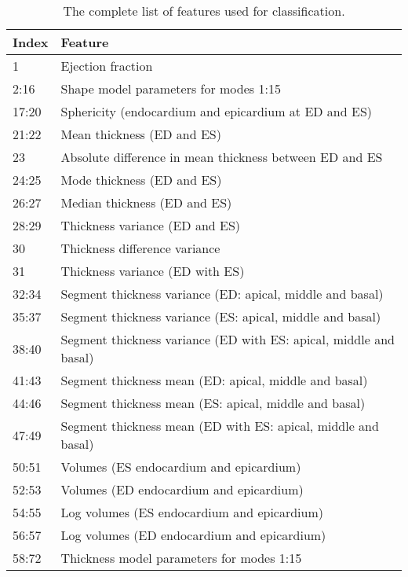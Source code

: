 \documentclass[journal]{IEEEtran}
\begin{document}
\begin{table}

		\begin{center}
	
		\begin{tabular}{l|l|}
\textbf{Index} \space & \multicolumn{1}{l}{\textbf{Feature}}
\\
 \hline
\cline{1-2}
 1 & Ejection fraction \\
\cline{1-2}
 2:16 & Shape model parameters for modes 1:15\\
\cline{1-2}
 17:20 & Sphericity (endocardium and epicardium at ED and ES)\\
 \cline{1-2}
 21:22 & Mean thickness (ED and ES)\\
  23 & Absolute difference in mean thickness between ED and ES\\
 
  24:25 & Mode thickness (ED and ES)\\
  
  26:27 & Median thickness (ED and ES)\\
  
  28:29 & Thickness variance (ED and ES)\\
  
  30 & Thickness difference variance\\
  
  31 & Thickness variance (ED with ES)\\
   \cline{1-2}
  32:34 & Segment thickness variance (ED: apical, middle and basal)\\
   35:37 & Segment thickness variance (ES: apical, middle and basal)\\
  
  38:40 & Segment thickness variance (ED with ES: apical, middle and basal)\\
  \cline{1-2}
  41:43 & Segment thickness mean (ED: apical, middle and basal)\\
  44:46 & Segment thickness mean (ES: apical, middle and basal)\\
   47:49 & Segment thickness mean (ED with ES: apical, middle and basal)\\
   \cline{1-2}
   50:51 & Volumes (ES endocardium and epicardium) \\
   52:53 & Volumes (ED endocardium and epicardium) \\
   \cline{1-2}
    54:55 & Log volumes (ES endocardium and epicardium) \\
   56:57 & Log volumes (ED endocardium and epicardium) \\
    \cline{1-2}
    58:72 & Thickness model parameters for modes 1:15\\

     \cline{1-2}
     \end{tabular}
\\\
		\caption{The complete list of features used for classification.}
		\label{table:featurelist}
		\end{center}
		\end{table}
\end{document}
